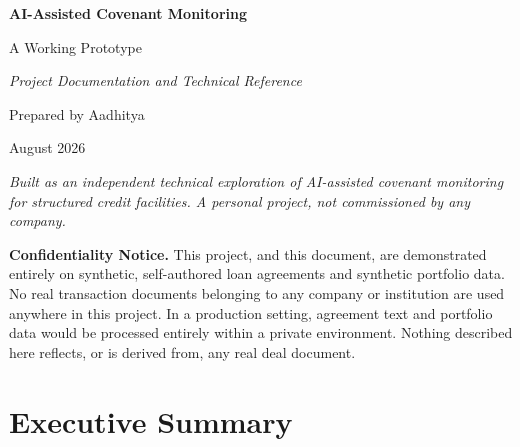 \documentclass[11pt,a4paper]{article}
\begin{document}
\begin{titlepage}
\centering
\vspace*{2.5cm}

{\Huge\bfseries AI-Assisted Covenant Monitoring}

\vspace{0.6cm}
{\Large A Working Prototype}

\vspace{0.4cm}
{\large\itshape Project Documentation and Technical Reference}

\vspace{2.5cm}

{\large Prepared by Aadhitya}

\vspace{0.3cm}
{\large August 2026}

\vspace{2.5cm}

\begin{minipage}{0.8\textwidth}
\centering
\small\itshape
Built as an independent technical exploration of AI-assisted covenant monitoring for structured credit facilities. A personal project, not commissioned by any company.
\end{minipage}

\vfill

\end{titlepage}

\begin{noticebox}
\textbf{Confidentiality Notice.} This project, and this document, are demonstrated entirely on synthetic, self-authored loan agreements and synthetic portfolio data. No real transaction documents belonging to any company or institution are used anywhere in this project. In a production setting, agreement text and portfolio data would be processed entirely within a private environment. Nothing described here reflects, or is derived from, any real deal document.
\end{noticebox}

\vspace{1cm}

\section*{Executive Summary}
\end{document}
